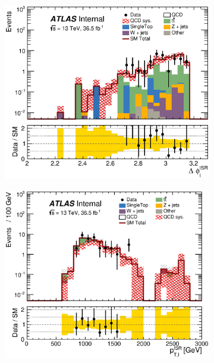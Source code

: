 \begin{figure}[!h]
\begin{center}
    \begin{subfigure}[b]{0.40\textwidth}  
    \includegraphics[width=\textwidth]{figures/QCDJetSmearing/CRQC/dphiISRI_36500.eps}
                \caption{ }
    \end{subfigure}
    \begin{subfigure}[b]{0.40\textwidth}  
    \includegraphics[width=\textwidth]{figures/QCDJetSmearing/CRQC/PTISR_36500}
                \caption{ }

\end{subfigure}
\end{center}
\end{figure}
